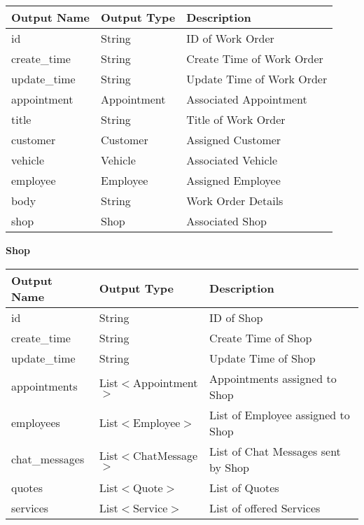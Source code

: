 \documentclass[12pt, titlepage]{article}
\begin{document}
\begin{table}[H]
	\begin{tabular}{|l|l|l|}
		\hline
		\textbf{Output Name} & \textbf{Output Type} & \textbf{Description}      \\
		\hline
		id                   & String               & ID of Work Order          \\
		\hline
		create\_time         & String               & Create Time of Work Order \\
		\hline
		update\_time         & String               & Update Time of Work Order \\
		\hline
		appointment          & Appointment          & Associated Appointment    \\
		\hline
		title                & String               & Title of Work Order       \\
		\hline
		customer             & Customer             & Assigned Customer         \\
		\hline
		vehicle              & Vehicle              & Associated Vehicle        \\
		\hline
		employee             & Employee             & Assigned Employee         \\
		\hline
		body                 & String               & Work Order Details        \\
		\hline
		shop                 & Shop                 & Associated Shop           \\
		\hline
	\end{tabular}
\end{table}

\textbf{Shop}

\begin{table}[H]
	\begin{tabular}{|l|l|l|}
		\hline
		\textbf{Output Name} & \textbf{Output Type}  & \textbf{Description}               \\
		\hline
		id                   & String                & ID of Shop                         \\
		\hline
		create\_time         & String                & Create Time of Shop                \\
		\hline
		update\_time         & String                & Update Time of Shop                \\
		\hline
		appointments         & List$<$Appointment$>$ & Appointments assigned to Shop      \\
		\hline
		employees            & List$<$Employee$>$    & List of Employee assigned to Shop  \\
		\hline
		chat\_messages       & List$<$ChatMessage$>$ & List of Chat Messages sent by Shop \\
		\hline
		quotes               & List$<$Quote$>$       & List of Quotes                     \\
		\hline
		services             & List$<$Service$>$     & List of offered Services           \\
		\hline
	\end{tabular}
\end{table}
\end{document}
